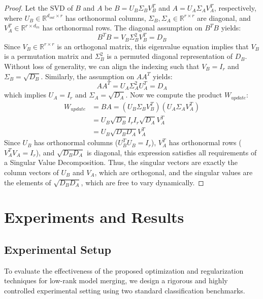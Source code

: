\documentclass{article}
\begin{document}
\begin{proof}
Let the SVD of $B$ and $A$ be $B = U_B \Sigma_B V_B^T$ and $A = U_A \Sigma_A V_A^T$, respectively, where $U_B \in \mathbb{R}^{d_{out} \times r}$ has orthonormal columns, $\Sigma_B, \Sigma_A \in \mathbb{R}^{r \times r}$ are diagonal, and $V_A^T \in \mathbb{R}^{r \times d_{in}}$ has orthonormal rows. The diagonal assumption on $B^T B$ yields:
\begin{equation}
    B^T B = V_B \Sigma_B^2 V_B^T = D_B
\end{equation}
Since $V_B \in \mathbb{R}^{r \times r}$ is an orthogonal matrix, this eigenvalue equation implies that $V_B$ is a permutation matrix and $\Sigma_B^2$ is a permuted diagonal representation of $D_B$. Without loss of generality, we can align the indexing such that $V_B = I_r$ and $\Sigma_B = \sqrt{D_B}$. Similarly, the assumption on $A A^T$ yields:
\begin{equation}
    A A^T = U_A \Sigma_A^2 U_A^T = D_A
\end{equation}
which implies $U_A = I_r$ and $\Sigma_A = \sqrt{D_A}$. Now we compute the product $W_{update}$:
\begin{align}
    W_{update} &= B A = (U_B \Sigma_B V_B^T)(U_A \Sigma_A V_A^T) \\
    &= U_B \sqrt{D_B} I_r I_r \sqrt{D_A} V_A^T \\
    &= U_B \sqrt{D_B D_A} V_A^T
\end{align}
Since $U_B$ has orthonormal columns ($U_B^T U_B = I_r$), $V_A^T$ has orthonormal rows ($V_A^T V_A = I_r$), and $\sqrt{D_B D_A}$ is diagonal, this expression satisfies all requirements of a Singular Value Decomposition. Thus, the singular vectors are exactly the column vectors of $U_B$ and $V_A$, which are orthogonal, and the singular values are the elements of $\sqrt{D_B D_A}$, which are free to vary dynamically.
\end{proof}

\section{Experiments and Results}
\label{submission-experiments}

\subsection{Experimental Setup}
To evaluate the effectiveness of the proposed optimization and regularization techniques for low-rank model merging, we design a rigorous and highly controlled experimental setting using two standard classification benchmarks.
\end{document}
